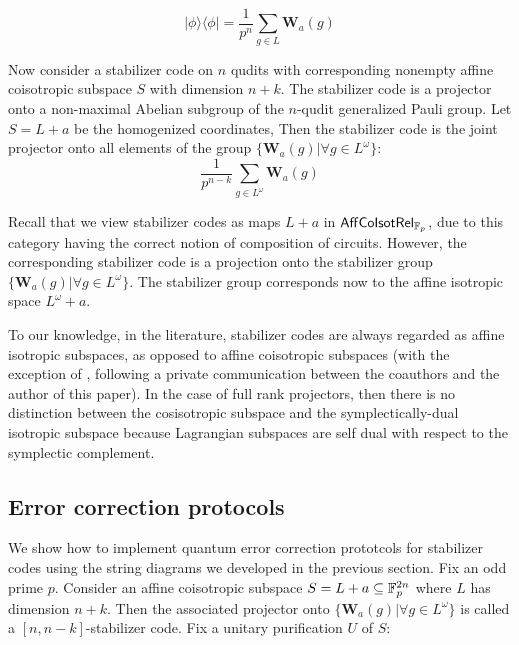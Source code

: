 $$
| \phi \rangle\langle\phi |= \dfrac{1}{p^n}\sum_{g \in L} \mathbf{W}_a(g)
$$
%
%

Now consider  a stabilizer code on $n$ qudits  with corresponding nonempty affine coisotropic subspace $S$ with dimension $n+k$.  The stabilizer code is a projector onto a non-maximal Abelian subgroup of the $n$-qudit generalized Pauli group. Let $S=L+a$ be the homogenized coordinates,
Then the stabilizer code is the joint projector onto all elements of the group $\{ \mathbf{W}_a(g)|\forall g \in L^\omega\}$:
$$
\dfrac{1}{p^{n-k}} \sum_{g \in L^\omega} \mathbf{W}_a(g)
$$

Recall that we view stabilizer codes as maps $L+a$ in $\mathsf{Aff}{\sf Co}{\sf Isot}\mathsf{Rel}_{\mathbb{F}_p}$, due to this category having the correct notion of composition of circuits.  However, the corresponding stabilizer code is a projection onto the stabilizer group $\{ \mathbf{W}_a(g)|\forall g \in L^\omega\}$.  The stabilizer group corresponds now to the affine isotropic space $L^\omega +a $.



 To our knowledge, in the literature, stabilizer codes are always regarded as affine isotropic subspaces, as opposed to affine coisotropic subspaces (with the exception of \cite{booth}, following a private communication between the coauthors and the author of this paper). In the case of full rank projectors, then there is no distinction between the cosisotropic subspace and the symplectically-dual isotropic subspace  because Lagrangian subspaces are self dual with respect to the symplectic complement.

\subsection{Error correction protocols}
We show how to implement quantum error correction prototcols for stabilizer codes using the string diagrams we developed in the previous section. 
Fix an odd prime $p$.
Consider an affine coisotropic subspace $S=L+a \subseteq \mathbb{F}_p^{2n}$ where $L$ has dimension $n+k$.  Then the associated projector onto $\{ \mathbf{W}_a(g)|\forall g \in L^\omega\}$ is called a $[n,n-k]$-stabilizer code. Fix a unitary purification $U$ of $S$:

